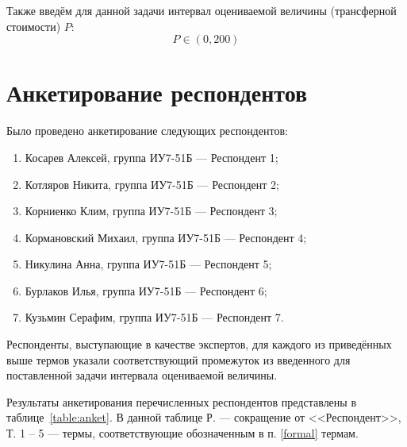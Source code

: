 Также введём для данной задачи интервал оцениваемой величины (трансферной стоимости) $P$:
\begin{equation}
	\label{eq:h}
	P \in (0, 200)
\end{equation}

\section{Анкетирование респондентов}

Было проведено анкетирование следующих респондентов:
\begin{enumerate}[label=\arabic*)]
	\item Косарев Алексей, группа ИУ7-51Б --- Респондент 1;
	\item Котляров Никита, группа ИУ7-51Б --- Респондент 2;
	\item Корниенко Клим, группа ИУ7-51Б --- Респондент 3;
	\item Кормановский Михаил, группа ИУ7-51Б --- Респондент 4;
	\item Никулина Анна, группа ИУ7-51Б --- Респондент 5;
	\item Бурлаков Илья, группа ИУ7-51Б --- Респондент 6;
        \item Кузьмин Серафим, группа ИУ7-51Б --- Респондент 7.
\end{enumerate}

Респонденты, выступающие в качестве экспертов, для каждого из приведённых выше термов указали соответствующий промежуток из введенного для поставленной задачи интервала оцениваемой величины.

Результаты анкетирования перечисленных респондентов представлены в таблице~\ref{table:anket}. В данной таблице Р. --- сокращение от <<Респондент>>, Т. 1 -- 5 --- термы, соответствующие обозначенным в п. \ref{formal} термам.

